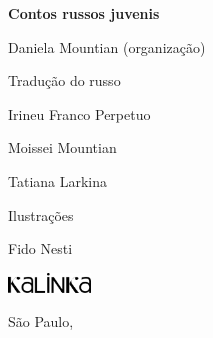 




\begingroup\thispagestyle{empty}\parindent0pt%

              \Huge 
              \textbf{Contos russos juvenis}
              \vspace{2em}

  					  \large
              {\textmdbf Daniela Mountian (organização)}
              \vspace{2em}

              \normalsize  
              {\textmdbf Tradução do russo}

              Irineu Franco Perpetuo

              Moissei Mountian

              Tatiana Larkina

              \bigskip

              {\textmdbf Ilustrações}

              Fido Nesti

              \vfill

              \begin{center}

              \includegraphics[width=2.2cm]{./logo.jpg}

              São Paulo, \the\year
              \end{center}
\endgroup
\pagebreak
